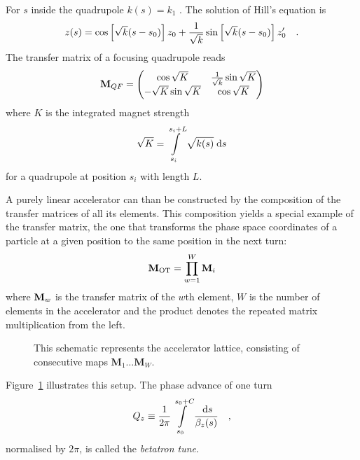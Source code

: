 For $s$ inside the quadrupole $k(s) = k_1$ . The solution of Hill's equation is
%
\begin{equation}
    z(s) = \cos \left[ \sqrt{k}(s-s_0)\right] z_0 +
        \frac{1}{\sqrt{k}}\sin\left[\sqrt{k}(s-s_0)\right]z_0'
    \label{eq_quad_transfer}
    \quad .
\end{equation}
%
The transfer matrix of a focusing quadrupole reads
%
\begin{equation}
    \mathbf{M}_{QF} =
    \begin{pmatrix}
        \cos \sqrt{K} & \frac{1}{\sqrt{k}} \sin \sqrt{K} \\
        -\sqrt{K}\sin \sqrt{K} & \cos \sqrt{K}
    \end{pmatrix}
    \label{eq_trmat_quad}
\end{equation}
%
where $K$ is the integrated magnet strength
%
\begin{equation}
    \sqrt{K} = \int\limits_{s_i}^{s_i + L} \sqrt{k(s)}\;\text{d} s
\end{equation}
%
for a quadrupole at position $s_i$ with length $L$.

A purely linear accelerator can than be constructed by the composition of the transfer matrices of 
all its elements. This composition yields a special example of the transfer matrix, the one that
transforms the phase space coordinates of a particle at a given position to the same position in the
next turn:
%
\begin{equation}
    \mathbf{M}_\text{OT} = \prod\limits_{w=1}^W \mathbf{M}_i
\end{equation}
%
where $\mathbf{M}_w$ is the transfer matrix of the $w$th element, $W$ is the number of elements in the
accelerator and the product denotes the repeated matrix multiplication from the left.
\begin{figure}
    \centering
    
    \caption{This schematic represents the accelerator lattice, consisting of consecutive maps
    $\mathbf{M}_1 \ldots \mathbf{M}_W$.
    }
    \label{fig_lattice}
\end{figure}
%
Figure~\ref{fig_lattice} illustrates this setup.
The phase advance of one turn
%
\begin{equation}
    Q_z \equiv \frac{1}{2\pi}\int\limits_{s_0}^{s_0+C} \frac{\;\text{d} s}{\beta_z(s)}
    \quad ,
\end{equation}
%
normalised by $2\pi$, is called the \emph{betatron tune}.

